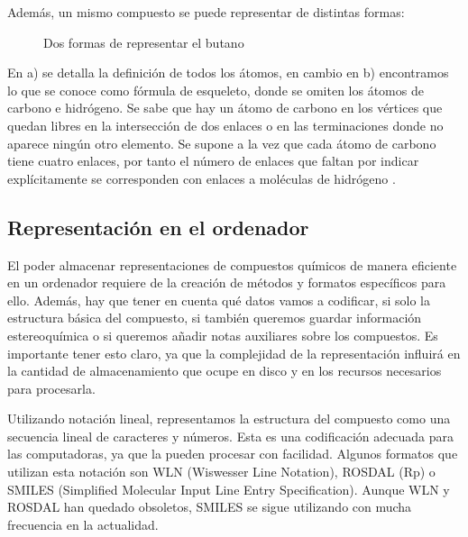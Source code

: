 Además, un mismo compuesto se puede representar de distintas formas:
\begin{figure}[H]
\centering
    \caption{Dos formas de representar el butano} 
\end{figure}

En a) se detalla la definición de todos los átomos, en cambio en b) encontramos lo que se conoce como fórmula de esqueleto, donde se omiten los átomos de carbono e hidrógeno. Se sabe que hay un átomo de carbono en los vértices que quedan libres en la intersección de dos enlaces o en las terminaciones donde no aparece ningún otro elemento. Se supone a la vez que cada átomo de carbono tiene cuatro enlaces, por tanto el número de enlaces que faltan por indicar explícitamente se corresponden con enlaces a moléculas de hidrógeno \cite{formestructural,structrep}.


\subsection{Representación en el ordenador}
El poder almacenar representaciones de compuestos químicos de manera eficiente en un ordenador requiere de la creación de métodos y formatos específicos para ello. Además, hay que tener en cuenta qué datos vamos a codificar, si solo la estructura básica del compuesto, si también queremos guardar información estereoquímica o si queremos añadir notas auxiliares sobre los compuestos. Es importante tener esto claro, ya que la complejidad de la representación influirá en la cantidad de almacenamiento que ocupe en disco y en los recursos necesarios para procesarla.

Utilizando notación lineal, representamos la estructura del compuesto como una secuencia lineal de caracteres y números. Esta es una codificación adecuada para las computadoras, ya que la pueden procesar con facilidad. Algunos formatos que utilizan esta notación son WLN (Wiswesser Line Notation), ROSDAL (Rp) o SMILES (Simplified Molecular Input Line Entry Specification). Aunque WLN y ROSDAL han quedado obsoletos, SMILES se sigue utilizando con mucha frecuencia en la actualidad. \cite{doi:10.1021/ci600234z}

